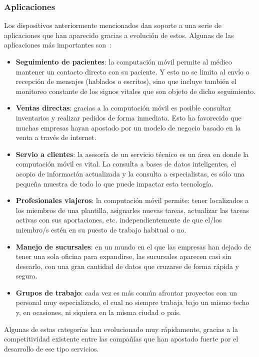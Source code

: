   \subsubsection{Aplicaciones}
Los dispositivos anteriormente mencionados dan soporte a una serie de
aplicaciones que han aparecido gracias a evolución de estos.
Algunas de las aplicaciones más importantes son~\cite{bib:micMobileComputing}:
\begin{itemize}
\item \textbf{Seguimiento de pacientes}: la computación móvil permite al
médico mantener un contacto directo con su paciente. Y esto no se limita
al envío o recepción de mensajes (hablados o escritos), sino que incluye
también el monitoreo constante de los signos vitales que son objeto de dicho
seguimiento.
\item \textbf{Ventas directas}: gracias a la computación móvil es posible
consultar inventarios y realizar pedidos de forma inmediata. Esto ha favorecido
que muchas empresas hayan apostado por un modelo de negocio basado en la
venta a través de internet.
\item \textbf{Servio a clientes}: la asesoría de un servicio técnico es un
área en donde la computación móvil es vital. La consulta a bases de datos
inteligentes, el acopio de información actualizada y la consulta a
especialistas, es sólo una pequeña muestra de todo lo que puede impactar
esta tecnología.
\item \textbf{Profesionales viajeros}: la computación móvil permite:
tener localizados a los miembros de una plantilla, asignarles nuevas tareas,
actualizar las tareas activas con sus aportaciones, etc. independientemente
de que el/los miembro/s estén en su puesto de trabajo habitual o no.
\item \textbf{Manejo de sucursales}: en un mundo en el que las empresas han
dejado de tener una sola oficina para expandirse, las sucursales aparecen casi
sin desearlo, con una gran cantidad de datos que cruzarse de forma rápida y
segura.
\item \textbf{Grupos de trabajo}: cada vez es más común afrontar proyectos
con un personal muy especializado, el cual no siempre trabaja bajo un mismo
techo y, en ocasiones, ni siquiera en la misma ciudad o país.
\end{itemize}

Algunas de estas categorías han evolucionado muy rápidamente, gracias a la
competitividad existente entre las compañías que han apostado fuerte por el
desarrollo de ese tipo servicios.

